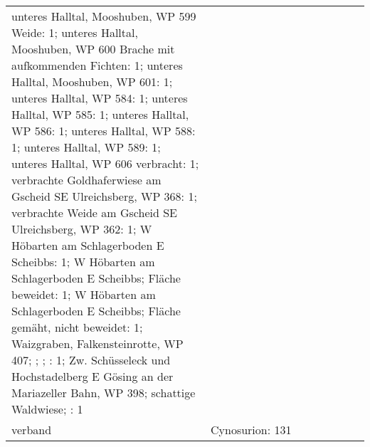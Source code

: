 \documentclass[9pt]{article}
\begin{document}
\begin{longtable}{lllllllllllllll}
unteres Halltal, Mooshuben, WP 599 Weide: 1; unteres Halltal, Mooshuben, WP 600 Brache mit aufkommenden Fichten: 1; unteres Halltal, Mooshuben, WP 601: 1; unteres Halltal, WP 584: 1; unteres Halltal, WP 585: 1; unteres Halltal, WP 586: 1; unteres Halltal, WP 588: 1; unteres Halltal, WP 589: 1; unteres Halltal, WP 606 verbracht: 1; verbrachte Goldhaferwiese am Gscheid SE Ulreichsberg, WP 368: 1; verbrachte Weide am Gscheid SE Ulreichsberg, WP 362: 1; W Höbarten am Schlagerboden E Scheibbs: 1; W Höbarten am Schlagerboden E Scheibbs; Fläche beweidet: 1; W Höbarten am Schlagerboden E Scheibbs; Fläche gemäht, nicht beweidet: 1; Waizgraben, Falkensteinrotte, WP 407; ; ; : 1; Zw. Schüsseleck und Hochstadelberg E Gösing an der Mariazeller Bahn, WP 398; schattige Waldwiese; : 1}\tabularnewline
verband& \multicolumn{14}{p{150mm}}{Cynosurion: 131}\tabularnewline
\bottomrule
\end{longtable}
\end{document}
